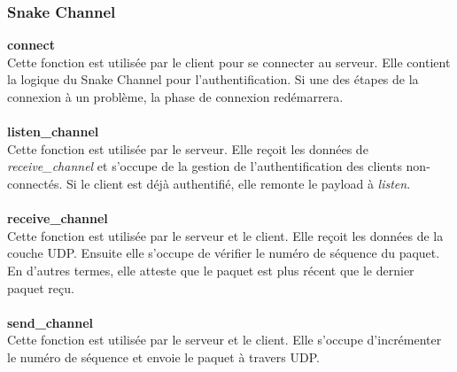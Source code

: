 \documentclass[a4paper]{article}
\begin{document}
\subsubsection{Snake Channel}
\textbf{connect}\\
Cette fonction est utilisée par le client pour se connecter au serveur. Elle contient la logique du Snake Channel pour l'authentification.
Si une des étapes de la connexion à un problème, la phase de connexion redémarrera.\\\\
\textbf{listen\_channel}\\
Cette fonction est utilisée par le serveur. Elle reçoit les données de \textit{receive\_channel} et s'occupe de la gestion de l'authentification des clients non-connectés.
Si le client est déjà authentifié, elle remonte le payload à \textit{listen}.\\\\
\textbf{receive\_channel}\\
Cette fonction est utilisée par le serveur et le client. Elle reçoit les données de la couche UDP. Ensuite elle s'occupe de vérifier le numéro de séquence du paquet.
En d'autres termes, elle atteste que le paquet est plus récent que le dernier paquet reçu.\\\\
\textbf{send\_channel}\\
Cette fonction est utilisée par le serveur et le client. Elle s'occupe d'incrémenter le numéro de séquence et envoie le paquet à travers UDP.\\\\
\end{document}
